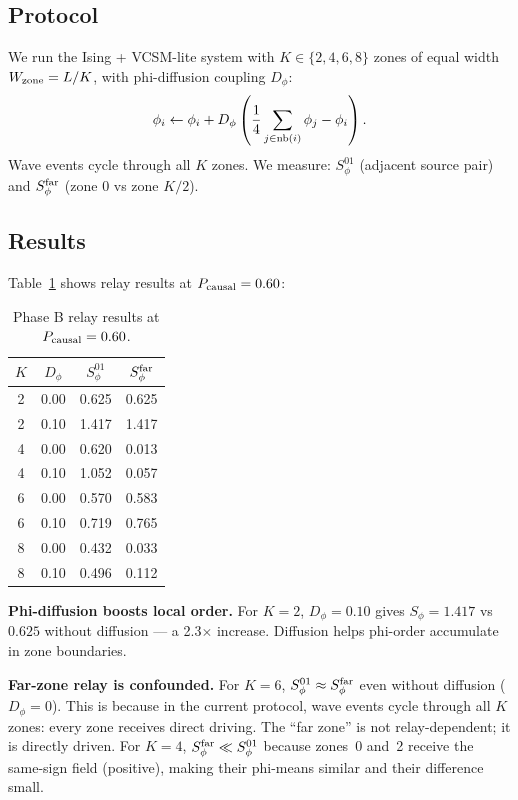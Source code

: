 \documentclass[12pt,a4paper]{article}
\begin{document}
\subsection{Protocol}

We run the Ising + VCSM-lite system with $K \in \{2, 4, 6, 8\}$ zones
of equal width $W_{\rm zone} = L/K$, with phi-diffusion coupling $D_\phi$:
\begin{equation}
  \phi_i \leftarrow \phi_i + D_\phi \left(\frac{1}{4}\sum_{j \in {\rm nb}(i)} \phi_j - \phi_i\right).
\end{equation}
Wave events cycle through all $K$ zones.
We measure:
$S_\phi^{01}$ (adjacent source pair) and $S_\phi^{\rm far}$ (zone 0 vs zone $K/2$).

\subsection{Results}

Table~\ref{tab:relay_B} shows relay results at $P_{\rm causal} = 0.60$:

\begin{table}[h]
\centering
\caption{Phase B relay results at $P_{\rm causal}=0.60$.}
\label{tab:relay_B}
\begin{tabular}{cccc}
\toprule
$K$ & $D_\phi$ & $S_\phi^{01}$ & $S_\phi^{\rm far}$ \\
\midrule
2 & 0.00 & 0.625 & 0.625 \\
2 & 0.10 & 1.417 & 1.417 \\
4 & 0.00 & 0.620 & 0.013 \\
4 & 0.10 & 1.052 & 0.057 \\
6 & 0.00 & 0.570 & 0.583 \\
6 & 0.10 & 0.719 & 0.765 \\
8 & 0.00 & 0.432 & 0.033 \\
8 & 0.10 & 0.496 & 0.112 \\
\bottomrule
\end{tabular}
\end{table}

\textbf{Phi-diffusion boosts local order.}
For $K=2$, $D_\phi=0.10$ gives $S_\phi = 1.417$ vs $0.625$ without diffusion --- a 2.3$\times$ increase.
Diffusion helps phi-order accumulate in zone boundaries.

\textbf{Far-zone relay is confounded.}
For $K=6$, $S_\phi^{01} \approx S_\phi^{\rm far}$ even without diffusion ($D_\phi=0$).
This is because in the current protocol, wave events cycle through all $K$ zones:
every zone receives direct driving.
The ``far zone'' is not relay-dependent; it is directly driven.
For $K=4$, $S_\phi^{\rm far} \ll S_\phi^{01}$ because zones~0 and~2 receive the
same-sign field (positive), making their phi-means similar and their difference small.
\end{document}
